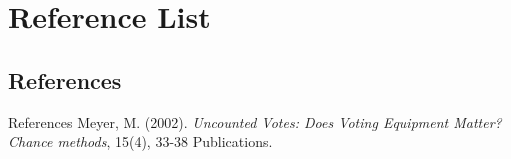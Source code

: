 \documentclass{beamer}
\begin{document}
\section{Reference List}
\subsection{References}

\begin{frame}{References}
  \leftskip 0.1in
  \parindent -0.1in
  Meyer, M. (2002). \textit{Uncounted Votes: Does Voting Equipment Matter? Chance methods}, 15(4), 33-38 Publications.
\end{frame}
\end{document}
